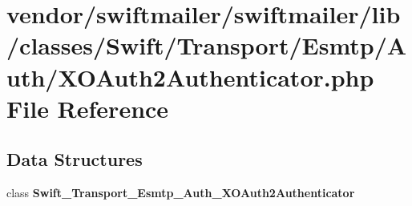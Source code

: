 \section{vendor/swiftmailer/swiftmailer/lib/classes/\+Swift/\+Transport/\+Esmtp/\+Auth/\+X\+O\+Auth2\+Authenticator.php File Reference}
\label{_x_o_auth2_authenticator_8php}
\subsection*{Data Structures}
\begin{DoxyCompactItemize}
\item 
class {\bf Swift\+\_\+\+Transport\+\_\+\+Esmtp\+\_\+\+Auth\+\_\+\+X\+O\+Auth2\+Authenticator}
\end{DoxyCompactItemize}
